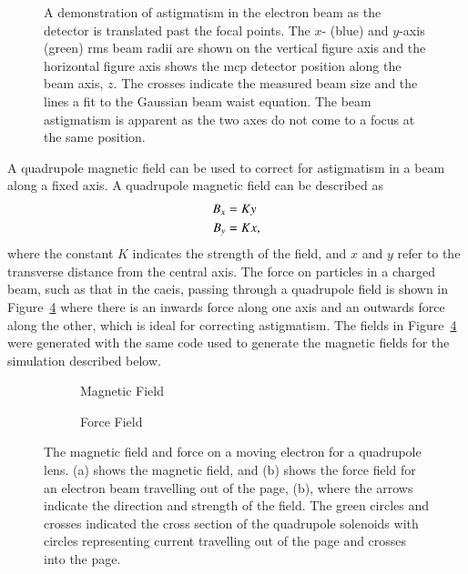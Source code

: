 \begin{figure}
    \centering
    
    \caption[Electron beam astigmatism.]{A demonstration of astigmatism in the electron beam as the detector is translated past the focal points. The $x$- (blue) and $y$-axis (green) \gls{rms} beam radii are shown on the vertical figure axis and the horizontal figure axis shows the \gls{mcp} detector position along the beam axis, $z$.
    The crosses indicate the measured beam size and the lines a fit to the Gaussian beam waist equation.
    The beam astigmatism is apparent as the two axes do not come to a focus at the same position.}
    \label{figure:astigmatism_translation}
\end{figure}

A quadrupole magnetic field can be used to correct for astigmatism in a beam along a fixed axis.
A quadrupole magnetic field can be described as
\begin{align}
B_x &= K y \notag\\
B_y &= K x,
\end{align}
where the constant $K$ indicates the strength of the field, and $x$ and $y$ refer to the transverse distance from the central axis.
The force on particles in a charged beam, such as that in the \gls{caeis}, passing through a quadrupole field is shown in Figure~\ref{figure:quadrupole_example} where there is an inwards force along one axis and an outwards force along the other, which is ideal for correcting astigmatism.
The fields in Figure~\ref{figure:quadrupole_example} were generated with the same code used to generate the magnetic fields for the simulation described below.

\begin{figure}
    \centering
    \begin{subfigure}{0.49\linewidth}
    \centering
    
    \caption{Magnetic Field}
    \label{figure:quadrupole_example_field}
    \end{subfigure}
    \begin{subfigure}{0.49\linewidth}
    \centering
    
    \caption{Force Field}
    \label{figure:quadrupole_example_force}
    \end{subfigure}
    \caption[Quadrupole magnetic and force fields.]{The magnetic field and force on a moving electron for a quadrupole lens. (a) shows the magnetic field, and (b) shows the force field for an electron beam travelling out of the page, (b), where the arrows indicate the direction and strength of the field.
    The green circles and crosses indicated the cross section of the quadrupole solenoids with circles representing current travelling out of the page and crosses into the page.}
    \label{figure:quadrupole_example}
\end{figure}

